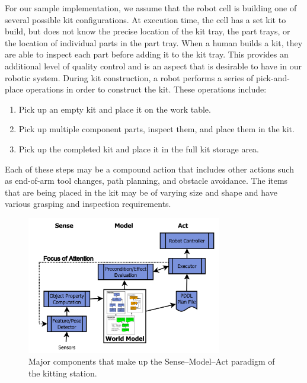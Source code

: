 For our sample implementation, we assume that the robot cell is building one of several possible kit configurations. At execution time, the
cell has a set kit to build, but does not know the precise location of the kit tray, the part trays, or the location of individual parts in the part tray.
When a human builds a kit, they are able to inspect each part before adding it to the kit tray. This provides an additional level of quality control and
is an aspect that is desirable to have in our robotic system. During kit construction,
a robot performs a series of pick-and-place operations
in order to construct the kit. These operations include:
\begin{enumerate}
\item Pick up an empty kit and place it on the work table.
\item Pick up multiple component parts, inspect them, and place them in the kit.
\item Pick up the completed kit and place it in the full kit storage area.
\end{enumerate}
Each of these steps may be a compound action that includes
other actions such as end-of-arm tool changes, path planning,
and obstacle avoidance. The items that are being placed in the kit may be of varying size and shape and have various grasping and inspection
requirements.
%
\begin{figure}[htb!]
\begin{center}
\includegraphics[width=8.5cm]{images/RITAExecution.jpg}
\caption{Major components that make up the Sense--Model--Act paradigm of the kitting station.}
\label{fig:SenseModelAct}
\end{center}
\end{figure}